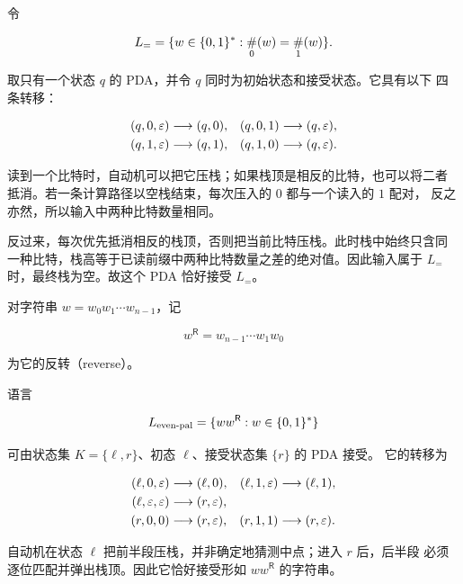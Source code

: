 \begin{example}[含有相同数量的 $0$ 和 $1$]
  \label{ex:pda-equal-zeroes-ones}
  令

  \[
    L_{=}=\{w\in\{0,1\}^{*}:\mathop{\#}_0(w)=\mathop{\#}_1(w)\}.
  \]

  取只有一个状态 $q$ 的 PDA，并令 $q$ 同时为初始状态和接受状态。它具有以下
  四条转移：

  \begin{align*}
    (q,0,\varepsilon)&\longrightarrow(q,0), &
    (q,0,1)&\longrightarrow(q,\varepsilon),\\
    (q,1,\varepsilon)&\longrightarrow(q,1), &
    (q,1,0)&\longrightarrow(q,\varepsilon).
  \end{align*}

  读到一个比特时，自动机可以把它压栈；如果栈顶是相反的比特，也可以将二者
  抵消。若一条计算路径以空栈结束，每次压入的 $0$ 都与一个读入的 $1$ 配对，
  反之亦然，所以输入中两种比特数量相同。

  反过来，每次优先抵消相反的栈顶，否则把当前比特压栈。此时栈中始终只含同
  一种比特，栈高等于已读前缀中两种比特数量之差的绝对值。因此输入属于
  $L_{=}$ 时，最终栈为空。故这个 PDA 恰好接受 $L_{=}$。
\end{example}

对字符串 $w=w_0w_1\cdots w_{n-1}$，记

\[
  w^{\mathsf R}=w_{n-1}\cdots w_1w_0
\]

为它的反转（reverse）。

\begin{example}[偶数长度的回文串]
  \label{ex:pda-even-palindromes}
  语言

  \[
    L_{\mathrm{even\text{-}pal}}
      =\{ww^{\mathsf R}:w\in\{0,1\}^{*}\}
  \]

  可由状态集 $K=\{\ell,r\}$、初态 $\ell$、接受状态集 $\{r\}$ 的 PDA 接受。
  它的转移为

  \begin{align*}
    (\ell,0,\varepsilon)&\longrightarrow(\ell,0), &
    (\ell,1,\varepsilon)&\longrightarrow(\ell,1),\\
    (\ell,\varepsilon,\varepsilon)&\longrightarrow(r,\varepsilon),\\
    (r,0,0)&\longrightarrow(r,\varepsilon), &
    (r,1,1)&\longrightarrow(r,\varepsilon).
  \end{align*}

  自动机在状态 $\ell$ 把前半段压栈，并非确定地猜测中点；进入 $r$ 后，后半段
  必须逐位匹配并弹出栈顶。因此它恰好接受形如 $ww^{\mathsf R}$ 的字符串。
\end{example}

